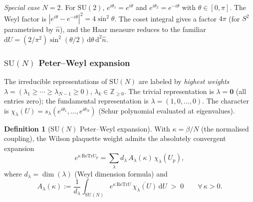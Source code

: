 \documentclass[11pt,a4paper]{amsart}
\theoremstyle{definition}
\newtheorem{definition}[theorem]{Definition}
\newcommand{\SU}{\mathrm{SU}}
\newcommand{\Z}{\mathbb{Z}}
\newcommand{\re}{\mathrm{Re}}
\newcommand{\Tr}{\mathrm{Tr}}
\begin{document}
\noindent\emph{Special case $N=2$.}
For $\SU(2)$, $e^{i\theta_1} = e^{i\theta}$ and $e^{i\theta_2} = e^{-i\theta}$
with $\theta\in[0,\pi]$.  The Weyl factor is $|e^{i\theta}-e^{-i\theta}|^2
= 4\sin^2\theta$.  The coset integral gives a factor $4\pi$ (for $S^2$
parametrised by $\hat{n}$), and the Haar measure reduces to the familiar
$\mathrm{d}U = (2/\pi^2)\sin^2(\theta/2)\,\mathrm{d}\theta\,\mathrm{d}^2\hat{n}$.

\subsubsection*{$\SU(N)$ Peter--Weyl expansion}

The irreducible representations of $\SU(N)$ are labeled by
\emph{highest weights} $\lambda = (\lambda_1 \ge \cdots \ge \lambda_{N-1} \ge 0)$,
$\lambda_k \in \Z_{\ge 0}$.
The trivial representation is $\lambda = \mathbf{0}$ (all entries zero);
the fundamental representation is $\lambda = (1,0,\ldots,0)$.
The character is $\chi_\lambda(U) = s_\lambda(e^{i\theta_1},\ldots,e^{i\theta_N})$
(Schur polynomial evaluated at eigenvalues).

\begin{definition}[$\SU(N)$ Peter--Weyl expansion]
\label{def:PW_SUN}
With $\kappa = \beta/N$ (the normalised coupling), the Wilson plaquette
weight admits the absolutely convergent expansion
\begin{equation}
\label{eq:PW_SUN}
  e^{\kappa\,\re\Tr U_p}
  = \sum_\lambda d_\lambda\,A_\lambda(\kappa)\,\chi_\lambda(U_p),
\end{equation}
where $d_\lambda = \dim(\lambda)$ (Weyl dimension formula) and
\begin{equation}
\label{eq:Alambda}
  A_\lambda(\kappa)
  := \frac{1}{d_\lambda}
     \int_{\SU(N)} e^{\kappa\,\re\Tr U}\,\overline{\chi_\lambda(U)}\,\mathrm{d}U
  \;>\; 0
  \qquad\forall\,\kappa > 0.
\end{equation}
\end{definition}
\end{document}
